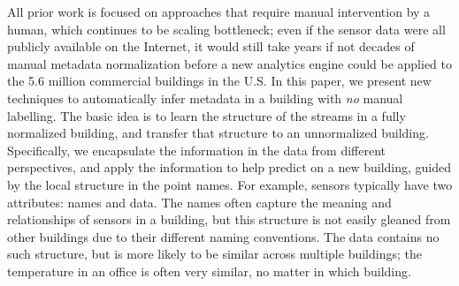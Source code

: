 All prior work is focused on approaches that require manual intervention by a human, which continues to be scaling bottleneck; even if the sensor data were all publicly available on the Internet, it would still take years if not decades of manual metadata normalization before a new analytics engine could be applied to the 5.6 million commercial buildings in the U.S.
In this paper, we present new techniques to automatically infer metadata in a building with {\it no} manual labelling. 
The basic idea is to learn the structure of the streams in a fully normalized building, and transfer that structure to an unnormalized building. 
Specifically, we encapsulate the information in the data from different perspectives, and apply the information to help predict on a new building, guided by the local structure in the point names.
For example, sensors typically have two attributes: names and data. The names often capture the meaning and relationships of sensors in a building, but this structure is not easily gleaned from other buildings due to their different naming conventions. 
The data contains no such structure, but is more likely to be similar across multiple buildings; the temperature in an office is often very similar, no matter in which building. 

